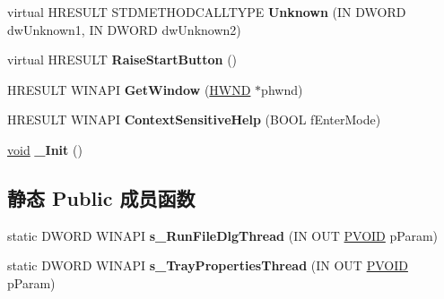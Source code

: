 \begin{DoxyCompactItemize}
\mbox{\label{class_c_tray_window_a6697a6db7623d93997d31b151120b239}} 
virtual H\+R\+E\+S\+U\+LT S\+T\+D\+M\+E\+T\+H\+O\+D\+C\+A\+L\+L\+T\+Y\+PE {\bfseries Unknown} (IN D\+W\+O\+RD dw\+Unknown1, IN D\+W\+O\+RD dw\+Unknown2)
\item 
\mbox{\label{class_c_tray_window_adae0e0ee4ce35d932bc43da23c9cc2d1}} 
virtual H\+R\+E\+S\+U\+LT {\bfseries Raise\+Start\+Button} ()
\item 
\mbox{\label{class_c_tray_window_aa8f5dc8ad821da9f2f1d9563ed5ef8cd}} 
H\+R\+E\+S\+U\+LT W\+I\+N\+A\+PI {\bfseries Get\+Window} (\hyperlink{interfacevoid}{H\+W\+ND} $\ast$phwnd)
\item 
\mbox{\label{class_c_tray_window_a8e560507a4ea8d62dd28bb87615d6000}} 
H\+R\+E\+S\+U\+LT W\+I\+N\+A\+PI {\bfseries Context\+Sensitive\+Help} (B\+O\+OL f\+Enter\+Mode)
\item 
\mbox{\label{class_c_tray_window_aebc47470929e9bede8f7346120ee0c88}} 
\hyperlink{interfacevoid}{void} {\bfseries \+\_\+\+Init} ()
\end{DoxyCompactItemize}
\subsection*{静态 Public 成员函数}
\begin{DoxyCompactItemize}
\item 
\mbox{\label{class_c_tray_window_a596207c75dd2b5e7595403388d7bd53e}} 
static D\+W\+O\+RD W\+I\+N\+A\+PI {\bfseries s\+\_\+\+Run\+File\+Dlg\+Thread} (IN O\+UT \hyperlink{interfacevoid}{P\+V\+O\+ID} p\+Param)
\item 
\mbox{\label{class_c_tray_window_a9282916e7272f7ef1cd6c7f4425d78e0}} 
static D\+W\+O\+RD W\+I\+N\+A\+PI {\bfseries s\+\_\+\+Tray\+Properties\+Thread} (IN O\+UT \hyperlink{interfacevoid}{P\+V\+O\+ID} p\+Param)
\end{DoxyCompactItemize}
